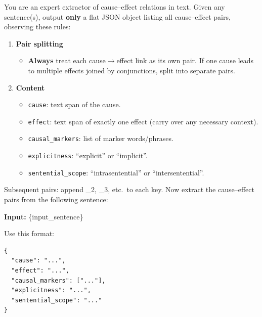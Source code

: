 \documentclass[conference]{IEEEtran}
\begin{document}




\begin{tcolorbox}[
  title=\textbf{1. Experiment 2: Zero shot General Instruction Prompt},
  colback=gray!5,
  colframe=black!75,
  fonttitle=\bfseries,
  breakable
]
You are an expert extractor of cause--effect relations in text. Given any sentence(s), output \textbf{only} a flat JSON object listing all cause--effect pairs, observing these rules:
\begin{enumerate}[label=\arabic*.]
  \item \textbf{Pair splitting}
    \begin{itemize}
      \item \textbf{Always} treat each cause$\to$effect link as its own pair. If one cause leads to multiple effects joined by conjunctions, split into separate pairs.
    \end{itemize}
  \item \textbf{Content}
    \begin{itemize}
      \item \texttt{cause}: text span of the cause.
      \item \texttt{effect}: text span of exactly one effect (carry over any necessary context).
      \item \texttt{causal\_markers}: list of marker words/phrases.
      \item \texttt{explicitness}: ``explicit'' or ``implicit''.
      \item \texttt{sentential\_scope}: ``intrasentential'' or ``intersentential''.
    \end{itemize}
\end{enumerate}
Subsequent pairs: append \_2, \_3, etc.\ to each key. Now extract the cause--effect pairs from the following sentence:

\textbf{Input:} \{input\_sentence\}

Use this format:
\begin{verbatim}
{
  "cause": "...",
  "effect": "...",
  "causal_markers": ["..."],
  "explicitness": "...",
  "sentential_scope": "..."
}
\end{verbatim}
\end{tcolorbox}
\end{document}
